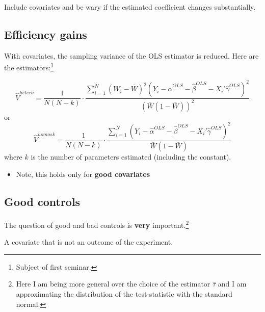 \documentclass[
  letterpaper,
  DIV=11,
  numbers=noendperiod]{scrreprt}
\providecommand{\tightlist}{%
  \setlength{\itemsep}{0pt}\setlength{\parskip}{0pt}}\usepackage{longtable,booktabs,array}
\theoremstyle{definition}
\theoremstyle{remark}
\begin{document}
\begin{tcolorbox}[enhanced jigsaw, breakable, colframe=quarto-callout-tip-color-frame, toptitle=1mm, toprule=.15mm, opacitybacktitle=0.6, opacityback=0, rightrule=.15mm, titlerule=0mm, colback=white, bottomtitle=1mm, title={In practice}, arc=.35mm, coltitle=black, colbacktitle=quarto-callout-tip-color!10!white, leftrule=.75mm, bottomrule=.15mm, left=2mm]

Include covariates and be wary if the estimated coefficient changes
substantially.

\end{tcolorbox}

\hypertarget{efficiency-gains}{%
\subsection{Efficiency gains}\label{efficiency-gains}}

With covariates, the sampling variance of the OLS estimator is reduced.
Here are the estimators:\footnote{Subject of first seminar.}

\[
\hat{V}^{hetero} = \frac{1}{N(N-k)}\cdot\frac{\sum_{i=1}^{N}(W_i-\bar{W})^2(Y_i-\hat{\alpha}^{OLS}-\hat{\beta}^{OLS}-X_i'\hat{\gamma}^{OLS})^2}{\left(\bar{W}(1-\bar{W})\right)^2}
\] or \[
            \hat{V}^{homosk} = \frac{1}{N(N-k)}\cdot\frac{\sum_{i=1}^{N}(Y_i-\hat{\alpha}^{OLS}-\hat{\beta}^{OLS}-X_i'\hat{\gamma}^{OLS})^2}{\bar{W}(1-\bar{W})}
\] where \(k\) is the number of parameters estimated (including the
constant).

\par

\begin{itemize}
\tightlist
\item
  Note, this holds only for \textbf{good covariates}
\end{itemize}

\hypertarget{good-controls}{%
\subsection{Good controls}\label{good-controls}}

The question of good and bad controls is \textbf{very}
important.\footnote{Here I am being more general over the choice of the
  estimator \(\hat{\tau}\) and I am approximating the distribution of
  the test-statistic with the standard normal.}

\begin{tcolorbox}[enhanced jigsaw, breakable, colframe=quarto-callout-note-color-frame, toptitle=1mm, toprule=.15mm, opacitybacktitle=0.6, opacityback=0, rightrule=.15mm, titlerule=0mm, colback=white, bottomtitle=1mm, title={Good control}, arc=.35mm, coltitle=black, colbacktitle=quarto-callout-note-color!10!white, leftrule=.75mm, bottomrule=.15mm, left=2mm]

A covariate that is not an outcome of the experiment.

\end{tcolorbox}
\end{document}
